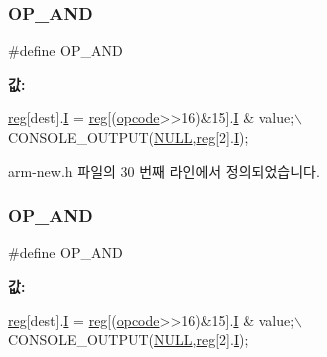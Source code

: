 \subsubsection{\texorpdfstring{O\+P\+\_\+\+A\+ND}{OP\_AND}\hspace{0.1cm}{\footnotesize\ttfamily [1/2]}}
{\footnotesize\ttfamily \#define O\+P\+\_\+\+A\+ND}

{\bfseries 값\+:}
\begin{DoxyCode}
\mbox{\hyperlink{_g_b_a_8h_ae29faba89509024ffd1a292badcedf2d}{reg}}[dest].\mbox{\hyperlink{unionreg__pair_a9f6a42d56c07829d7013571eda998252}{I}} = \mbox{\hyperlink{_g_b_a_8h_ae29faba89509024ffd1a292badcedf2d}{reg}}[(\mbox{\hyperlink{arm-new_8h_a4fc220098f4b9d0e039a28274d05c198}{opcode}}>>16)&15].\mbox{\hyperlink{arm-new_8h_a782b7c7c9a56a2031f6270eac7f000d6}{I}} & value;\(\backslash\)
      CONSOLE\_OUTPUT(\mbox{\hyperlink{getopt1_8c_a070d2ce7b6bb7e5c05602aa8c308d0c4}{NULL}},\mbox{\hyperlink{_g_b_a_8h_ae29faba89509024ffd1a292badcedf2d}{reg}}[2].\mbox{\hyperlink{arm-new_8h_a782b7c7c9a56a2031f6270eac7f000d6}{I}});
\end{DoxyCode}


arm-\/new.\+h 파일의 30 번째 라인에서 정의되었습니다.

\mbox{\label{_g_b_a_8cpp_ac56577e3b08d3c7453db5d81d96bf05b}} 
\subsubsection{\texorpdfstring{O\+P\+\_\+\+A\+ND}{OP\_AND}\hspace{0.1cm}{\footnotesize\ttfamily [2/2]}}
{\footnotesize\ttfamily \#define O\+P\+\_\+\+A\+ND}

{\bfseries 값\+:}
\begin{DoxyCode}
\mbox{\hyperlink{_g_b_a_8h_ae29faba89509024ffd1a292badcedf2d}{reg}}[dest].\mbox{\hyperlink{unionreg__pair_a9f6a42d56c07829d7013571eda998252}{I}} = \mbox{\hyperlink{_g_b_a_8h_ae29faba89509024ffd1a292badcedf2d}{reg}}[(\mbox{\hyperlink{arm-new_8h_a4fc220098f4b9d0e039a28274d05c198}{opcode}}>>16)&15].\mbox{\hyperlink{arm-new_8h_a782b7c7c9a56a2031f6270eac7f000d6}{I}} & value;\(\backslash\)
      CONSOLE\_OUTPUT(\mbox{\hyperlink{getopt1_8c_a070d2ce7b6bb7e5c05602aa8c308d0c4}{NULL}},\mbox{\hyperlink{_g_b_a_8h_ae29faba89509024ffd1a292badcedf2d}{reg}}[2].\mbox{\hyperlink{arm-new_8h_a782b7c7c9a56a2031f6270eac7f000d6}{I}});
\end{DoxyCode}
\mbox{\label{arm-new_8h_aa69b64b0a164fc639f436a21fdacf2fd}} 
